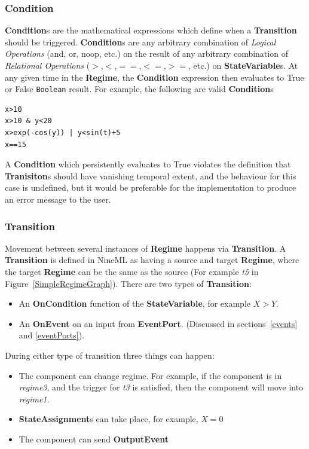 \documentclass{article}
\newcommand{\nmlClass}[1]{{\bf #1}}
\newcommand{\StateVariable}{{\bf{StateVariable}}\xspace}
\newcommand{\EventPort}{{\bf{EventPort}}\xspace}
\newcommand{\Regime}{{\bf{Regime}}\xspace}
\newcommand{\Transition}{{\bf{Transition}}\xspace}
\newcommand{\OnEvent}{{\bf{OnEvent}}\xspace}
\newcommand{\OnCondition}{{\bf{OnCondition}}\xspace}
\newcommand{\OutputEvent}{{\bf{OutputEvent}}\xspace}
\begin{document}
\subsubsection{Condition}

\nmlClass{Condition}s are the mathematical expressions which define
when a \nmlClass{Transition} should be triggered.
\nmlClass{Condition}s are any arbitrary combination of \emph{Logical
Operations} (and, or, noop, etc.) on the
result of any arbitrary combination of \emph{Relational Operations}
($>$,$<$,$==$,$<=$,$>=$, etc.) on
\nmlClass{StateVariable}s. At any given time in the \nmlClass{Regime},
the \nmlClass{Condition} expression then evaluates to True or False
{\tt Boolean} result. For example, the following are valid
\nmlClass{Condition}s

\begin{verbatim}
x>10
x>10 & y<20
x>exp(-cos(y)) | y<sin(t)+5
x==15
\end{verbatim}

A \nmlClass{Condition} which persistently evaluates to True
violates the definition that \nmlClass{Tranisiton}s should have vanishing
temporal extent, and the behaviour for this case is undefined, but
it would be preferable for the implementation to produce an error
message to the user.

\subsubsection{Transition}

Movement between several instances of \Regime happens via \Transition.
A \nmlClass{Transition} is defined in NineML as having
a source and target \nmlClass{Regime}, where the target
\nmlClass{Regime} can be the same as the source (For example \emph{t5}
in Figure~\ref{SimpleRegimeGraph}). There are two types of \Transition:

\begin{itemize}
\item An \OnCondition function of the \StateVariable, for
example $X > Y$.
\item An \OnEvent on an input from \EventPort. (Discussed in sections~\ref{events} and \ref{eventPorts}).
\end{itemize}

During either type of transition three things can happen:
\begin{itemize}
\item The component can change regime. For example, if
the component is in \emph{regime3}, and the trigger for \emph{t3} is
satisfied, then the component will move into \emph{regime1}.
\item \textbf{StateAssignment}s can take place, for example, $X=0$
\item The component can send \OutputEvent
\end{itemize}
\end{document}
